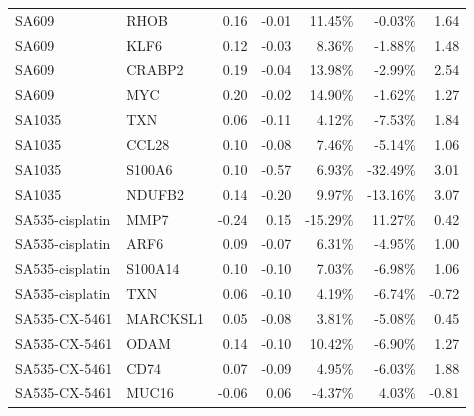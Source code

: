 \begin{table}[]
{\begin{tabular}{|llrrrrr|}
\hline
SA609           & RHOB     & 0.16     & -0.01      & 11.45\%             & -0.03\%               & 1.64   \\
SA609           & KLF6     & 0.12     & -0.03      & 8.36\%              & -1.88\%               & 1.48   \\
SA609           & CRABP2   & 0.19     & -0.04      & 13.98\%             & -2.99\%               & 2.54  \\
SA609           & MYC      & 0.20      & -0.02      & 14.90\%             & -1.62\%               & 1.27  \\
\hline
SA1035          & TXN      & 0.06     & -0.11      & 4.12\%              & -7.53\%               & 1.84  \\
SA1035          & CCL28    & 0.10      & -0.08      & 7.46\%              & -5.14\%               & 1.06   \\
SA1035          & S100A6   & 0.10      & -0.57      & 6.93\%              & -32.49\%              & 3.01   \\
SA1035          & NDUFB2   & 0.14     & -0.20       & 9.97\%              & -13.16\%              & 3.07 \\
\hline
SA535-cisplatin & MMP7     & -0.24    & 0.15       & -15.29\%            & 11.27\%               & 0.42   \\
SA535-cisplatin & ARF6     & 0.09     & -0.07      & 6.31\%              & -4.95\%               & 1.00     \\
SA535-cisplatin & S100A14  & 0.10      & -0.10       & 7.03\%              & -6.98\%               & 1.06   \\
SA535-cisplatin & TXN      & 0.06     & -0.10       & 4.19\%              & -6.74\%               & -0.72  \\
\hline
SA535-CX-5461   & MARCKSL1 & 0.05     & -0.08      & 3.81\%              & -5.08\%               & 0.45   \\
SA535-CX-5461   & ODAM     & 0.14     & -0.10       & 10.42\%             & -6.90\%               & 1.27   \\
SA535-CX-5461   & CD74     & 0.07     & -0.09      & 4.95\%              & -6.03\%               & 1.88  \\
SA535-CX-5461   & MUC16    & -0.06    & 0.06       & -4.37\%             & 4.03\%                & -0.81  \\
\hline
               
\end{tabular}%

\label{tab:Magnitudedifferenceintransgenesovertime}
}
\end{table}


